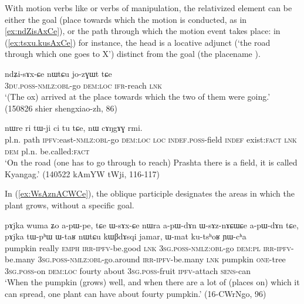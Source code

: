 With  motion verbs like  or verbs of manipulation, the relativized element can be either the goal (place towards which the motion is conducted, as in \ref{ex:ndZisAxCe}), or the path through which the motion event takes place: in (\ref{ex:tsxu.kusAxCe}) for instance, the head  is a locative adjunct (`the road through which one goes to X') distinct from the goal (the placename ).

\begin{exe}
\ex \label{ex:ndZisAxCe}
\gll ndʑi-sɤx-ɕe nɯtɕu jo-zɣɯt tɕe \\
\textsc{3du}.\textsc{poss}-\textsc{nmlz}:\textsc{obl}-go \textsc{dem}:\textsc{loc} \textsc{ifr}-reach \textsc{lnk} \\
\glt  `(The ox) arrived at the place towards which the two of them were going.' (150826 shier shengxiao-zh, 86)
\end{exe}

\begin{exe}
\ex \label{ex:tsxu.kusAxCe}
 nɯre ri tɯ-ji ci tu tɕe, nɯ cɤŋgɤɣ rmi. \\
pl.n. path \textsc{ipfv}:east-\textsc{nmlz}:\textsc{obl}-go \textsc{dem}:\textsc{loc} \textsc{loc} \textsc{indef}.\textsc{poss}-field \textsc{indef} exist:\textsc{fact} \textsc{lnk} \textsc{dem} pl.n. be.called:\textsc{fact} \\
\glt  `On the road (one has to go through to reach) Prashta there is a field, it is called Kyangag.' (140522 kAmYW tWji, 116-117)
\end{exe}

In (\ref{ex:WsAznACWCe}), the oblique participle designates the areas in which the plant grows, without a specific goal.

\begin{exe}
\ex \label{ex:WsAznACWCe}
\gll  pɤjka wuma ʑo a-pɯ-pe, tɕe ɯ-sɤx-ɕe nɯra a-pɯ-dɤn ɯ-sɤz-nɤɕɯɕe a-pɯ-dɤn tɕe, pɤjka tɯ-pʰɯ ɯ-taʁ nɯtɕu kɯβdɤsqi jamar, ɯ-mat ku-tsʰoʁ ɲɯ-cʰa \\
pumpkin really \textsc{emph} \textsc{irr}-\textsc{ipfv}-be.good \textsc{lnk} \textsc{3sg}.\textsc{poss}-\textsc{nmlz}:\textsc{obl}-go \textsc{dem}:\textsc{pl} \textsc{irr}-\textsc{ipfv}-be.many \textsc{3sg}.\textsc{poss}-\textsc{nmlz}:\textsc{obl}-go.around \textsc{irr}-\textsc{ipfv}-be.many  \textsc{lnk} pumpkin \textsc{one}-tree \textsc{3sg}.\textsc{poss}-on \textsc{dem}:\textsc{loc} fourty about \textsc{3sg}.\textsc{poss}-fruit \textsc{ipfv}-attach \textsc{sens}-can \\
\glt `When the pumpkin (grows) well, and when there are a lot of (places on) which it can spread, one plant can have about fourty pumpkin.' (16-CWrNgo, 96)
\end{exe}


